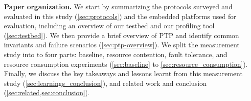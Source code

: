 %

\textbf{Paper organization.}
We start by summarizing the protocols surveyed and evaluated in this study (\cref{sec:protocols})
and the embedded platforms used for evaluation, including an overview of our testbed and our profiling tool \toolName{} (\cref{sec:testbed}).
We then provide a brief overview of PTP and identify common invariants and failure scenarios (\cref{sec:ptp-overview}).
We split the measurement study into to four parts: baseline, resource
contention, fault tolerance, and resource consumption experiments
(\cref{sec:baseline} to \cref{sec:resource_consumption}).
Finally, we discuss the key takeaways and lessons learnt from this
measurement study
(\cref{sec:learnings_conclusion}),
and related work and conclusion (\cref{sec:related,sec:conclusion}).
